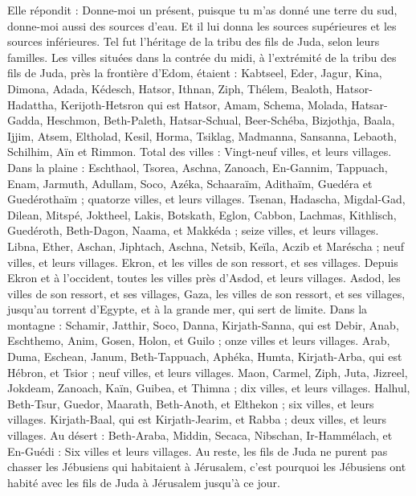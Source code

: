 \begin{multicols}{2}
Elle répondit : Donne-moi un présent, puisque tu m’as donné une terre du sud, donne-moi aussi des sources d’eau. Et il lui donna les sources supérieures et les sources inférieures.
Tel fut l’héritage de la tribu des fils de Juda, selon leurs familles.
Les villes situées dans la contrée du midi, à l’extrémité de la tribu des fils de Juda, près la frontière d’Edom, étaient : Kabtseel, Eder, Jagur,
Kina, Dimona, Adada,
Kédesch, Hatsor, Ithnan,
Ziph, Thélem, Bealoth,
Hatsor-Hadattha, Kerijoth-Hetsron qui est Hatsor,
Amam, Schema, Molada,
Hatsar-Gadda, Heschmon, Beth-Paleth,
Hatsar-Schual, Beer-Schéba, Bizjothja,
Baala, Ijjim, Atsem,
Eltholad, Kesil, Horma,
Tsiklag, Madmanna, Sansanna,
Lebaoth, Schilhim, Aïn et Rimmon. Total des villes : Vingt-neuf villes, et leurs villages.
Dans la plaine : Eschthaol, Tsorea, Aschna,
Zanoach, En-Gannim, Tappuach, Enam,
Jarmuth, Adullam, Soco, Azéka,
Schaaraïm, Adithaïm, Guedéra et Guedérothaïm ; quatorze villes, et leurs villages.
Tsenan, Hadascha, Migdal-Gad,
Dilean, Mitspé, Joktheel,
Lakis, Botskath, Eglon,
Cabbon, Lachmas, Kithlisch,
Guedéroth, Beth-Dagon, Naama, et Makkéda ; seize villes, et leurs villages.
Libna, Ether, Aschan,
Jiphtach, Aschna, Netsib,
Keïla, Aczib et Maréscha ; neuf villes, et leurs villages.
Ekron, et les villes de son ressort, et ses villages.
Depuis Ekron et à l’occident, toutes les villes près d’Asdod, et leurs villages.
Asdod, les villes de son ressort, et ses villages, Gaza, les villes de son ressort, et ses villages, jusqu’au torrent d’Egypte, et à la grande mer, qui sert de limite.
Dans la montagne : Schamir, Jatthir, Soco,
Danna, Kirjath-Sanna, qui est Debir,
Anab, Eschthemo, Anim,
Gosen, Holon, et Guilo ; onze villes et leurs villages.
Arab, Duma, Eschean,
Janum, Beth-Tappuach, Aphéka,
Humta, Kirjath-Arba, qui est Hébron, et Tsior ; neuf villes, et leurs villages.
Maon, Carmel, Ziph, Juta,
Jizreel, Jokdeam, Zanoach,
Kaïn, Guibea, et Thimna ; dix villes, et leurs villages.
Halhul, Beth-Tsur, Guedor,
Maarath, Beth-Anoth, et Elthekon ; six villes, et leurs villages.
Kirjath-Baal, qui est Kirjath-Jearim, et Rabba ; deux villes, et leurs villages.
Au désert : Beth-Araba, Middin, Secaca,
Nibschan, Ir-Hammélach, et En-Guédi : Six villes et leurs villages.
Au reste, les fils de Juda ne purent pas chasser les Jébusiens qui habitaient à Jérusalem, c’est pourquoi les Jébusiens ont habité avec les fils de Juda à Jérusalem jusqu’à ce jour.

\end{multicols}
